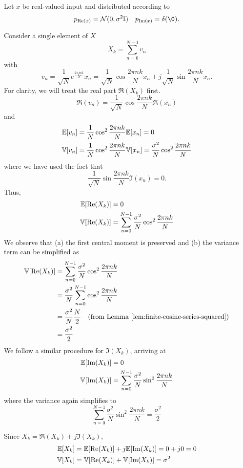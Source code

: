 Let $x$ be real-valued input and distributed according to
\[
p_{\Re(x)} = \mathcal{N}(0, \sigma^2 \Id) \quad p_{\Im(x)} = \delta(\0).
\]

Consider a single element of $X$ 
\[
    X_k = \sum_{n=0}^{N-1} v_n
\]
with 
%
\[
    v_n = \frac{1}{\sqrt{N}}e^{\frac{2\pi jnk}{N}}x_n = \frac{1}{\sqrt{N}}\cos \frac{2\pi nk}{N}x_n + j\frac{1}{\sqrt{N}}\sin\frac{2\pi nk}{N}x_n.
\]
%
For clarity, we will treat the real part $\Re(X_k)$ first. 
%
\[
    \Re(v_n) = \frac{1}{\sqrt{N}}\cos \frac{2\pi nk}{N} \Re(x_n) 
\]
%
and 
%
\[
    \begin{aligned}
        \mathbb{E}[v_n] &= \frac{1}{N} \cos^2{\frac{2\pi nk}{N}}\mathbb{E}[x_n] = 0\\
        \mathbb{V}[v_n] &= \frac{1}{N} \cos^2{\frac{2\pi nk}{N}}\mathbb{V}[x_n] = \frac{\sigma^2}{N} \cos^2{\frac{2\pi nk}{N}}  
    \end{aligned}
\]
%
where we have used the fact that 
%
\[
    \frac{1}{\sqrt{N}}\sin\frac{2\pi nk}{N}\Im(x_n) = 0.
\]
%
Thus,
%
\[
    \begin{aligned}
        \mathbb{E}[\Re(X_k)] &= 0\\
        \mathbb{V}[\Re(X_k)] &= \sum_{n=0}^{N-1}\frac{\sigma^2}{N} \cos^2{\frac{2\pi nk}{N}}
    \end{aligned}
\]
%
We observe that (a) the first central moment is preserved and (b) the variance term can be simplified as 
%
\[
    \begin{aligned}
    \mathbb{V}[\Re(X_k)] &= \sum_{n=0}^{N-1}\frac{\sigma^2}{N} \cos^2{\frac{2\pi nk}{N}} \\
    &=\frac{\sigma^2}{N}\sum_{n=0}^{N-1} \cos^2{\frac{2\pi nk}{N}} \\
    &= \frac{\sigma^2}{N}\frac{N}{2}\quad \text{(from Lemma \ref{lem:finite-cosine-series-squared})} \\
    &= \frac{\sigma^2}{2}
    \end{aligned}
\]
%
We follow a similar procedure for $\Im(X_k)$, arriving at
%
\[
    \begin{aligned}
        \mathbb{E}[\Im(X_k)] &= 0\\
        \mathbb{V}[\Im(X_k)] &= \sum_{n=0}^{N-1}\frac{\sigma^2}{N} \sin^2{\frac{2\pi nk}{N}}
    \end{aligned}
\]
%
where the variance again simplifies to
%
\[
    \sum_{n=0}^{N-1}\frac{\sigma^2}{N} \sin^2{\frac{2\pi nk}{N}} = \frac{\sigma^2}{2}
\]

Since $X_k = \Re(X_k) + j\Im(X_k)$,  
%
\[
    \begin{aligned}
        \mathbb{E}[X_k] &= \mathbb{E}[\Re(X_k)] + j\mathbb{E}[\Im(X_k)] = 0 + j0 = 0\\
        \mathbb{V}[X_k] &= \mathbb{V}[\Re(X_k)] + \mathbb{V}[\Im(X_k)] = \sigma^2
    \end{aligned}
\]
%
\endproof

